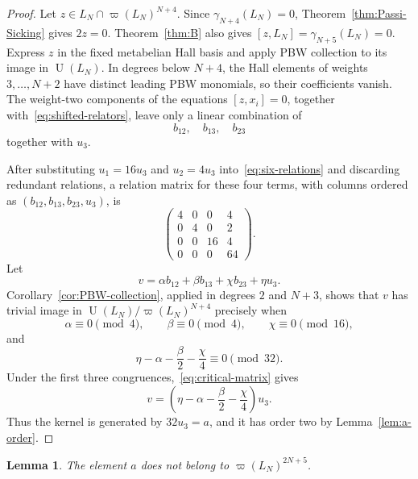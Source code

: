 \documentclass[a4paper,11pt,reqno]{amsart}
\newtheorem{lemma}[theorem]{Lemma}
\theoremstyle{definition}
\newcommand{\U}{\operatorname U}
\begin{document}
\begin{proof}
Let $z\in L_N\cap\varpi(L_N)^{N+4}$.  Since
$\gamma_{N+4}(L_N)=0$, Theorem~\ref{thm:Passi-Sicking} gives $2z=0$.
Theorem~\ref{thm:B} also gives $[z,L_N]=\gamma_{N+5}(L_N)=0$.  Express $z$
in the fixed metabelian Hall basis and apply PBW collection to its image in
$\U(L_N)$.
In degrees below $N+4$, the Hall elements of weights $3,\ldots,N+2$ have
distinct leading PBW monomials, so their coefficients vanish.  The
weight-two components of the equations $[z,x_i]=0$, together
with~\eqref{eq:shifted-relators}, leave only a linear combination of
\[
                         b_{12},\quad b_{13},\quad b_{23}
\]
together with $u_3$.

After substituting $u_1=16u_3$ and $u_2=4u_3$
into~\eqref{eq:six-relations} and discarding redundant relations, a relation
matrix for these four terms, with columns ordered as
$(b_{12},b_{13},b_{23},u_3)$, is
\begin{equation}\label{eq:critical-matrix}
 \begin{pmatrix}
  4&0&0&4\\
  0&4&0&2\\
  0&0&16&4\\
  0&0&0&64
 \end{pmatrix}.
\end{equation}
Let
\[
                 v=\alpha b_{12}+\beta b_{13}+\chi b_{23}+\eta u_3.
\]
Corollary~\ref{cor:PBW-collection}, applied in degrees $2$ and $N+3$, shows
that $v$ has trivial image in $\U(L_N)/\varpi(L_N)^{N+4}$ precisely when
\[
 \alpha\equiv0\pmod4,
 \qquad
 \beta\equiv0\pmod4,
 \qquad
 \chi\equiv0\pmod{16},
\]
and
\[
             \eta-\alpha-\frac{\beta}{2}-\frac{\chi}{4}
             \equiv0\pmod{32}.
\]
Under the first three congruences,~\eqref{eq:critical-matrix} gives
\[
 v=\left(\eta-\alpha-\frac{\beta}{2}-\frac{\chi}{4}\right)u_3.
\]
Thus the kernel is generated by $32u_3=a$, and it has order two by
Lemma~\ref{lem:a-order}.
\end{proof}

\begin{lemma}\label{lem:last-initial-form}
The element $a$ does not belong to $\varpi(L_N)^{2N+5}$.
\end{lemma}
\end{document}
